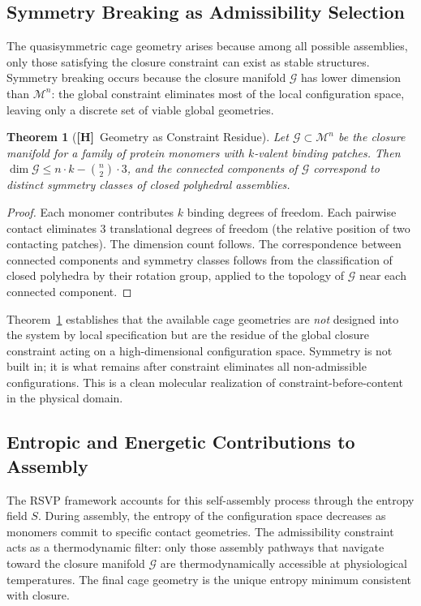 \documentclass[11pt, oneside]{article}
\numberwithin{equation}{section}
\newcommand{\ClaimH}{\textcolor{rsvpgray}{\textbf{[H]}}}
\theoremstyle{rsvpstyle}
\newtheorem{theorem}{Theorem}[section]
\theoremstyle{remark}
\begin{document}
\subsection{Symmetry Breaking as Admissibility Selection}

The quasisymmetric cage geometry arises because among all possible assemblies, only
those satisfying the closure constraint can exist as stable structures. Symmetry breaking
occurs because the closure manifold $\mathcal{G}$ has lower dimension than
$\mathcal{M}^n$: the global constraint eliminates most of the local configuration space,
leaving only a discrete set of viable global geometries.

\begin{theorem}[\ClaimH\ Geometry as Constraint Residue]
\label{thm:nanocage}
Let $\mathcal{G} \subset \mathcal{M}^n$ be the closure manifold for a family of protein
monomers with $k$-valent binding patches. Then $\dim \mathcal{G} \leq n \cdot k -
\binom{n}{2} \cdot 3$, and the connected components of $\mathcal{G}$ correspond to
distinct symmetry classes of closed polyhedral assemblies.
\end{theorem}

\begin{proof}
Each monomer contributes $k$ binding degrees of freedom. Each pairwise contact
eliminates 3 translational degrees of freedom (the relative position of two contacting
patches). The dimension count follows. The correspondence between connected components
and symmetry classes follows from the classification of closed polyhedra by their
rotation group, applied to the topology of $\mathcal{G}$ near each connected component.
\end{proof}

Theorem~\ref{thm:nanocage} establishes that the available cage geometries are
\emph{not} designed into the system by local specification but are the residue of the
global closure constraint acting on a high-dimensional configuration space. Symmetry
is not built in; it is what remains after constraint eliminates all non-admissible
configurations. This is a clean molecular realization of constraint-before-content
in the physical domain.

\subsection{Entropic and Energetic Contributions to Assembly}

The RSVP framework accounts for this self-assembly process through the entropy field
$S$. During assembly, the entropy of the configuration space decreases as monomers
commit to specific contact geometries. The admissibility constraint acts as a
thermodynamic filter: only those assembly pathways that navigate toward the closure
manifold $\mathcal{G}$ are thermodynamically accessible at physiological temperatures.
The final cage geometry is the unique entropy minimum consistent with closure.
\end{document}
